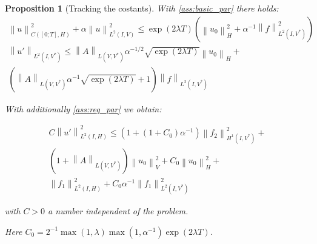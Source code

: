 \documentclass[english,a4paper,10pt,oneside]{scrbook}	%
\theoremstyle{break}
\newtheorem{prop}[equation]{Proposition}
\theoremstyle{remark}
\newcommand{\ds}{\displaystyle}
\newcommand{\norm}[1]{\left\lVert#1\right\rVert}
\newcommand{\HN}[1]{\norm{#1}_{H}}
\newcommand{\VN}[1]{\norm{#1}_{V}}
\begin{document}
\begin{prop}[Tracking the costants]
\label{thm:const_track}
With \cref{ass:basic_par} there holds:
\begin{align}
\norm{u}^2_{C([0;T],H)}+\alpha\norm{u}_{L^2(I,V)}^2\leq \exp(2\lambda T)(\HN{u_0}^2+\alpha^{-1}\norm{f}^2_{L^2(I,V^*)})\\
\norm{u'}_{L^2(I,V^*)}\leq \norm{A}_{L(V,V^*)}\alpha^{-1/2}\sqrt{\exp(2\lambda T)}\HN{u_0} +\\\left (\norm{A}_{L(V,V^*)}\alpha^{-1}\sqrt{\exp(2\lambda T)}+1\right ) \norm{f}_{L^2(I,V^*)}
\end{align}

With additionally \cref{ass:reg_par} we obtain:

\begin{align}
C\norm{u'}^2_{L^2(I,H)}\leq 
(1+(1+C_0)\alpha^{-1})\norm{f_2}_{H^1(I,V^*)}^2+\\
(1+\norm{A}_{L(V,V^*)})\VN{u_{0}}^2+C_0\HN{u_0}^2+\\
\norm{f_1}_{L^2(I,H)}^2+C_0\alpha^{-1}\norm{f_1}^2_{L^2(I,V^*)}
\end{align}

with $C>0$ a number independent of the problem.

Here $C_0 = \ds 2^{-1}\max(1,\lambda)\max(1,\alpha^{-1})\exp(2\lambda T)$.

\end{prop}
\end{document}
